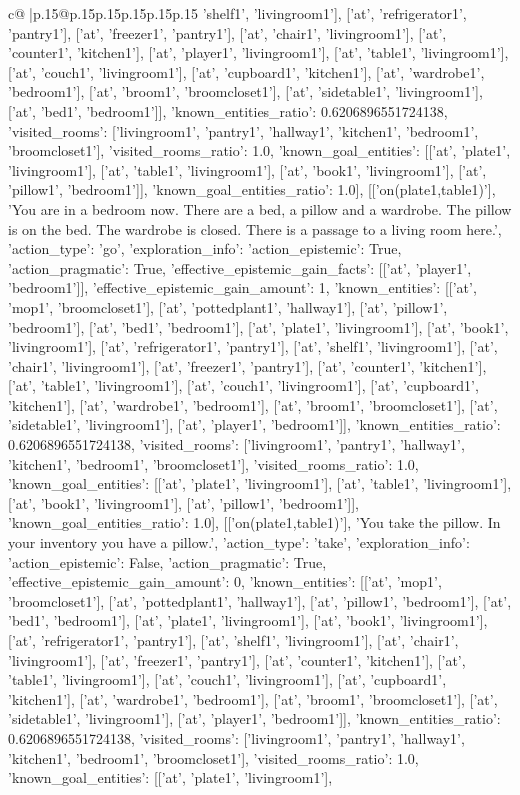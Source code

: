 \documentclass{article}
\begin{document}
{\begin{supertabular}{c@{$\;$}|p{.15\linewidth}@{}p{.15\linewidth}p{.15\linewidth}p{.15\linewidth}p{.15\linewidth}p{.15\linewidth}}
{{{'shelf1', 'livingroom1'], ['at', 'refrigerator1', 'pantry1'], ['at', 'freezer1', 'pantry1'], ['at', 'chair1', 'livingroom1'], ['at', 'counter1', 'kitchen1'], ['at', 'player1', 'livingroom1'], ['at', 'table1', 'livingroom1'], ['at', 'couch1', 'livingroom1'], ['at', 'cupboard1', 'kitchen1'], ['at', 'wardrobe1', 'bedroom1'], ['at', 'broom1', 'broomcloset1'], ['at', 'sidetable1', 'livingroom1'], ['at', 'bed1', 'bedroom1']], 'known_entities_ratio': 0.6206896551724138, 'visited_rooms': ['livingroom1', 'pantry1', 'hallway1', 'kitchen1', 'bedroom1', 'broomcloset1'], 'visited_rooms_ratio': 1.0, 'known_goal_entities': [['at', 'plate1', 'livingroom1'], ['at', 'table1', 'livingroom1'], ['at', 'book1', 'livingroom1'], ['at', 'pillow1', 'bedroom1']], 'known_goal_entities_ratio': 1.0}}], [['on(plate1,table1)'], 'You are in a bedroom now. There are a bed, a pillow and a wardrobe. The pillow is on the bed. The wardrobe is closed. There is a passage to a living room here.', {'action_type': 'go', 'exploration_info': {'action_epistemic': True, 'action_pragmatic': True, 'effective_epistemic_gain_facts': [['at', 'player1', 'bedroom1']], 'effective_epistemic_gain_amount': 1, 'known_entities': [['at', 'mop1', 'broomcloset1'], ['at', 'pottedplant1', 'hallway1'], ['at', 'pillow1', 'bedroom1'], ['at', 'bed1', 'bedroom1'], ['at', 'plate1', 'livingroom1'], ['at', 'book1', 'livingroom1'], ['at', 'refrigerator1', 'pantry1'], ['at', 'shelf1', 'livingroom1'], ['at', 'chair1', 'livingroom1'], ['at', 'freezer1', 'pantry1'], ['at', 'counter1', 'kitchen1'], ['at', 'table1', 'livingroom1'], ['at', 'couch1', 'livingroom1'], ['at', 'cupboard1', 'kitchen1'], ['at', 'wardrobe1', 'bedroom1'], ['at', 'broom1', 'broomcloset1'], ['at', 'sidetable1', 'livingroom1'], ['at', 'player1', 'bedroom1']], 'known_entities_ratio': 0.6206896551724138, 'visited_rooms': ['livingroom1', 'pantry1', 'hallway1', 'kitchen1', 'bedroom1', 'broomcloset1'], 'visited_rooms_ratio': 1.0, 'known_goal_entities': [['at', 'plate1', 'livingroom1'], ['at', 'table1', 'livingroom1'], ['at', 'book1', 'livingroom1'], ['at', 'pillow1', 'bedroom1']], 'known_goal_entities_ratio': 1.0}}], [['on(plate1,table1)'], 'You take the pillow. In your inventory you have a pillow.', {'action_type': 'take', 'exploration_info': {'action_epistemic': False, 'action_pragmatic': True, 'effective_epistemic_gain_amount': 0, 'known_entities': [['at', 'mop1', 'broomcloset1'], ['at', 'pottedplant1', 'hallway1'], ['at', 'pillow1', 'bedroom1'], ['at', 'bed1', 'bedroom1'], ['at', 'plate1', 'livingroom1'], ['at', 'book1', 'livingroom1'], ['at', 'refrigerator1', 'pantry1'], ['at', 'shelf1', 'livingroom1'], ['at', 'chair1', 'livingroom1'], ['at', 'freezer1', 'pantry1'], ['at', 'counter1', 'kitchen1'], ['at', 'table1', 'livingroom1'], ['at', 'couch1', 'livingroom1'], ['at', 'cupboard1', 'kitchen1'], ['at', 'wardrobe1', 'bedroom1'], ['at', 'broom1', 'broomcloset1'], ['at', 'sidetable1', 'livingroom1'], ['at', 'player1', 'bedroom1']], 'known_entities_ratio': 0.6206896551724138, 'visited_rooms': ['livingroom1', 'pantry1', 'hallway1', 'kitchen1', 'bedroom1', 'broomcloset1'], 'visited_rooms_ratio': 1.0, 'known_goal_entities': [['at', 'plate1', 'livingroom1'], }}}
\end{supertabular}}
\end{document}
